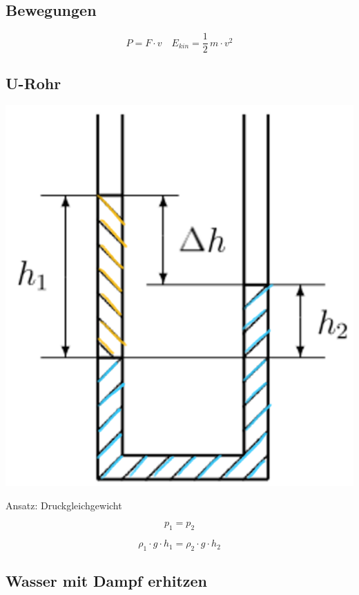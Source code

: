 \subsection{Bewegungen}

$$ \boxed{ P = F \cdot v } \quad \boxed{ E_{kin} = \frac{1}{2} \, m \cdot v^2 } $$


\subsection{U-Rohr}

\begin{minipage}{0.4\linewidth}
\includegraphics[width=\linewidth]{Bilder/u-rohr} \\
\end{minipage}
\hfill
\begin{minipage}{0.55\linewidth}
Ansatz: Druckgleichgewicht 

$$ p_1 = p_2 $$

$$ \rho_1 \cdot g \cdot h_1 = \rho_2 \cdot g \cdot h_2  $$
\end{minipage}


\subsection{Wasser mit Dampf erhitzen}

